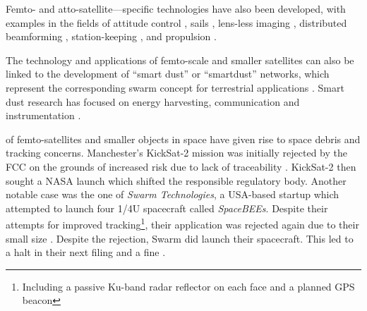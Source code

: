 \documentclass[a4paper,nobib,justified,final]{tufte-book}
\begin{document}
Femto- and atto-satellite---specific technologies have also been developed, with examples in the fields of attitude control \cite{liuDesignMagneticField2019,streetmanLimitationsScalingMomentum2017,weisChipscaleSpacecraftSwarms2017,stamatLaboratoryscaleTestPlatforms2019,vidal-valladaresFemtoSatelliteLocalizationMethod2022}, %
sails \cite{atchisonPassiveMicroscaleSolar2008,umansky-castroDesignAlphaCubeSat,atchisonPassiveSunpointingMillimeterscale2010,renNovelDesignThermal2021}, lens-less imaging \cite{kuoDiffuserCamDiffuserBasedLensless2017,boominathanPhlatCamDesignedPhaseMask2020,boominathanRecentAdvancesLensless2022,wuRealtimeDeeplearningAided2023,liLenslessCameraUnraveling2024}, distributed beamforming \cite{hadaeghDevelopment100GramClassSpacecraft2016}, station-keeping \cite{luckingElectrochromicOrbitControl2012,weisChipscaleSpacecraftSwarms2017,niccolaiReviewSmartDust2019,gondarDecentralizedControlElectromagnetic2021,timmonsExperimentalTestingRangebased2022}, and propulsion \cite{siegelSiliconWaferIntegration2020}.

The technology and applications of femto-scale and smaller satellites can also be linked to the development of ``smart dust'' or ``smartdust'' networks, which represent the corresponding swarm concept for terrestrial applications \autocite{ucberkeleyroboticsandintelligentmachineslabSMARTDUST2008}. Smart dust research has focused on energy harvesting, communication and instrumentation \cite{agoginoSensorValidationFusion,warnekeSmartDustCommunicating2001,romerTrackingRealWorldPhenomena2004,romerTrackingRealWorldPhenomena2004}.

\label{sec:LITERATURE_debris} of femto-satellites and smaller objects in space have given rise to space debris and tracking concerns. Manchester's KickSat-2 mission was initially rejected by the \ac{FCC} on the grounds of increased risk due to lack of traceability \cite{FCCBigProblem2018,thenationalassociationforamateurradioKickSat2AliveBeing2019,nwekeKickSat2DismissalPrejudice2016}. KickSat-2 then sought a \acs{NASA} launch which shifted the responsible regulatory body.
Another notable case was the one of \emph{Swarm Technologies}, a USA-based startup which attempted to launch four 1/4U spacecraft called \emph{SpaceBEEs}. Despite their attempts for improved tracking\footnote{Including a passive Ku-band radar reflector on each face and a planned GPS beacon}, their application was rejected again due to their small size \autocite{serafiniSWARMDismissalPrejudice2017}. Despite the rejection, Swarm did launch their spacecraft. This led to a halt in their next filing and a fine \autocite{harrisFCCAccusesStealthy2018}.
\end{document}
